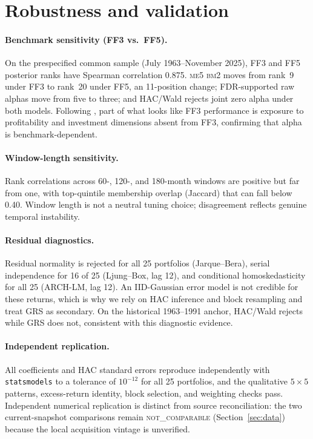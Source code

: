 \documentclass[11pt]{article}
\begin{document}
\section{Robustness and validation}\label{sec:robust}
\paragraph{Benchmark sensitivity (FF3 vs.\ FF5).}
On the prespecified common sample (July 1963--November 2025), FF3 and FF5
posterior ranks have Spearman correlation 0.875. \textsc{me5 bm2} moves from
rank~9 under FF3 to rank~20 under FF5, an 11-position change; FDR-supported raw
alphas move from five to three; and HAC/Wald rejects joint zero alpha under both
models. Following \citet{FamaFrench2015}, part of what looks like FF3
performance is exposure to profitability and investment dimensions absent from
FF3, confirming that alpha is benchmark-dependent.

\paragraph{Window-length sensitivity.}
Rank correlations across 60-, 120-, and 180-month windows are positive but far
from one, with top-quintile membership overlap (Jaccard) that can fall below
0.40. Window length is not a neutral tuning choice; disagreement reflects
genuine temporal instability.

\paragraph{Residual diagnostics.}
Residual normality is rejected for all 25 portfolios (Jarque--Bera), serial
independence for 16 of 25 (Ljung--Box, lag 12), and conditional
homoskedasticity for all 25 (ARCH-LM, lag 12). An IID-Gaussian error model is
not credible for these returns, which is why we rely on HAC inference and block
resampling and treat GRS as secondary. On the historical 1963--1991 anchor,
HAC/Wald rejects while GRS does not, consistent with this diagnostic evidence.

\paragraph{Independent replication.}
All coefficients and HAC standard errors reproduce independently with
\texttt{statsmodels} to a tolerance of $10^{-12}$ for all 25 portfolios, and the
qualitative $5\times5$ patterns, excess-return identity, block selection, and
weighting checks pass. Independent numerical replication is distinct from source
reconciliation: the two current-snapshot comparisons remain
\textsc{not\_comparable} (Section~\ref{sec:data}) because the local acquisition
vintage is unverified.
\end{document}

